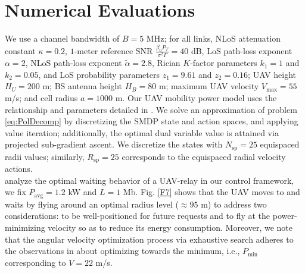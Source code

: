 \documentclass[10pt,twocolumn]{IEEEtran}
\begin{document}
\section{Numerical Evaluations}\label{V}
We use a channel bandwidth of $B{=}5$ MHz; for all links, NLoS attenuation constant $\kappa{=}0.2$, $1$-meter reference SNR $\frac{\beta_{0}P_{T}}{\sigma^{2}\Gamma}{=}40$ dB, LoS path-loss exponent $\alpha{=}2$, NLoS path-loss exponent $\tilde{\alpha}{=}2.8$, Rician $K$-factor parameters $k_{1}{=}1$ and $k_{2}{=}0.05$, and LoS probability parameters $z_{1}{=}9.61$ and $z_{2}{=}0.16$; UAV height $H_{U}{=}200$ m; BS antenna height $H_{B}{=}80$ m; maximum UAV velocity $V_{\mathrm{max}}{=}55$ m/s; and cell radius $a{=}1000$ m. Our UAV mobility power model uses the relationship and parameters detailed in \cite{SCA}. We solve an approximation of problem \eqref{eq:PolDecomp} by discretizing the SMDP state and action spaces, and applying value iteration; additionally, the optimal dual variable value is attained via projected sub-gradient ascent. We discretize the states with $N_{\mathrm{sp}}{=}25$ equispaced radii values; similarly, $R_{\mathrm{sp}}{=}25$ corresponds to the equispaced radial velocity actions.\\
 analyze the optimal waiting behavior of a UAV-relay in our control framework, we fix $P_{\mathrm{avg}}{=}1.2$ kW and $L{=}1$ Mb. Fig. \ref{F7} shows that the UAV moves to and waits by flying around an optimal radius level (${\approx}95$ m) to address two considerations: to be well-positioned for future requests and to fly at the power-minimizing velocity so as to reduce its energy consumption. Moreover, we note that the angular velocity optimization process via exhaustive search adheres to the observations in \cite{SCA} about optimizing towards the minimum, i.e., $P_{\mathrm{min}}$ corresponding to $V{=}22$ m/s.\\
\end{document}
